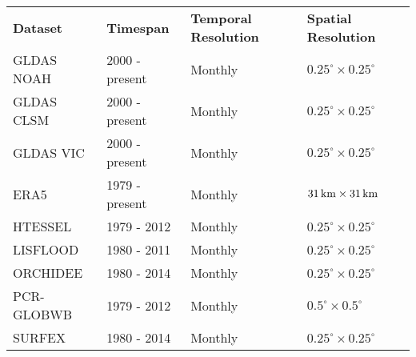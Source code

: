 \begin{table}[htbp]\centering
	\begin{tabular}{llll}
		&                                     &                                          &                                                                                \\ \hline
		\multicolumn{1}{|l|}{\textbf{Dataset}}    & \multicolumn{1}{l|}{\textbf{Timespan}}       & \multicolumn{1}{l|}{\textbf{Temporal Resolution}} & \multicolumn{1}{l|}{\textbf{Spatial Resolution}}  \\ \hline
		\multicolumn{1}{|l|}{GLDAS NOAH} & \multicolumn{1}{l|}{2000 - present} & \multicolumn{1}{l|}{Monthly}             & \multicolumn{1}{l|}{$0.25^{\circ} \times  0.25^{\circ}$}             \\ \hline
		\multicolumn{1}{|l|}{GLDAS CLSM} & \multicolumn{1}{l|}{2000 - present} & \multicolumn{1}{l|}{Monthly}             & \multicolumn{1}{l|}{$0.25^{\circ} \times 0.25^{\circ}$}             \\ \hline
		\multicolumn{1}{|l|}{GLDAS VIC}  & \multicolumn{1}{l|}{2000 - present} & \multicolumn{1}{l|}{Monthly}             & \multicolumn{1}{l|}{$0.25^{\circ} \times 0.25^{\circ}$}              \\   \hline
		\multicolumn{1}{|l|}{ERA5}       & \multicolumn{1}{l|}{1979 - present} & \multicolumn{1}{l|}{Monthly}             & \multicolumn{1}{l|}{$31\,\mathrm{km} \times 31\,\mathrm{km}$}                      \\ \hline
		\multicolumn{1}{|l|}{HTESSEL}       & \multicolumn{1}{l|}{1979 - 2012} & \multicolumn{1}{l|}{Monthly}             & \multicolumn{1}{l|}{$0.25^{\circ} \times 0.25^{\circ}$}                     \\ \hline
		\multicolumn{1}{|l|}{LISFLOOD}       & \multicolumn{1}{l|}{1980 - 2011} & \multicolumn{1}{l|}{Monthly}             & \multicolumn{1}{l|}{$0.25^{\circ} \times 0.25^{\circ}$}                    \\ \hline
		\multicolumn{1}{|l|}{ORCHIDEE}       & \multicolumn{1}{l|}{1980 - 2014} & \multicolumn{1}{l|}{Monthly}             & \multicolumn{1}{l|}{$0.25^{\circ} \times 0.25^{\circ}$}                      \\ \hline
		\multicolumn{1}{|l|}{PCR-GLOBWB}       & \multicolumn{1}{l|}{1979 - 2012} & \multicolumn{1}{l|}{Monthly}             & \multicolumn{1}{l|}{$0.5^{\circ} \times 0.5^{\circ}$}                      \\ \hline
		\multicolumn{1}{|l|}{SURFEX}       & \multicolumn{1}{l|}{1980 - 2014} & \multicolumn{1}{l|}{Monthly}             & \multicolumn{1}{l|}{$0.25^{\circ} \times 0.25^{\circ}$}                     \\ \hline

\end{tabular}
\end{table}
